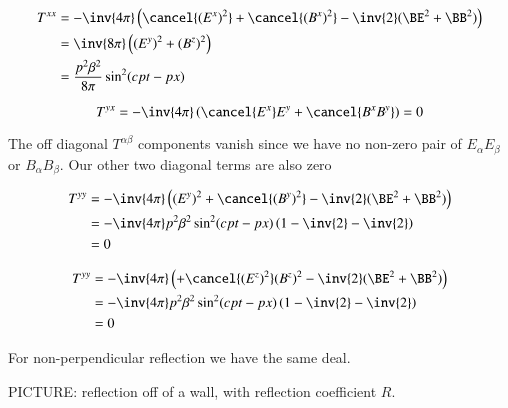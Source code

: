 \begin{align*}
T^{x x} 
&= -\inv{4 \pi} \left( 
\cancel{(E^x)^2}
+\cancel{(B^x)^2}
-\inv{2} (\BE^2 + \BB^2) \right) \\
&= \inv{8 \pi} \left( 
(E^y)^2
+(B^z)^2 \right) \\
&= \frac{p^2 \beta^2}{8 \pi} \sin^2 ( c p t - p x )
\end{align*}

\begin{equation}\label{eqn:relativisticElectrodynamicsL23:470}
T^{y x} = - \inv{4 \pi} \left( 
\cancel{ E^x } E^y + \cancel{ B^x B^y } \right) = 0
\end{equation}

The off diagonal $T^{\alpha \beta}$ components vanish since we have no non-zero pair of $E_\alpha E_\beta$ or $B_\alpha B_\beta$.  Our other two diagonal terms are also zero

\begin{align*}
T^{y y}
&= -\inv{4 \pi} \left( 
(E^y)^2
+\cancel{(B^y)^2}
-\inv{2} (\BE^2 + \BB^2) \right) \\
&= - \inv{4 \pi} p^2 \beta^2 \sin^2 ( c p t - p x ) \left( 1 - \inv{2} - \inv{2} \right) \\
&= 0
\end{align*}

\begin{align*}
T^{y y}
&= -\inv{4 \pi} \left( 
+\cancel{(E^z)^2}
(B^z)^2
-\inv{2} (\BE^2 + \BB^2) \right) \\
&= - \inv{4 \pi} p^2 \beta^2 \sin^2 ( c p t - p x ) \left( 1 - \inv{2} - \inv{2} \right)  \\
&= 0
\end{align*}

For non-perpendicular reflection we have the same deal.

PICTURE: reflection off of a wall, with reflection coefficient $R$.

\EndArticle
